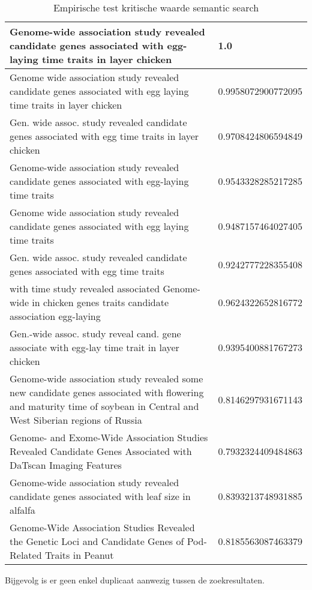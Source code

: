 \begin{table}[h!]
    \caption{Empirische test kritische waarde semantic search}
    \centering
    \begin{tabularx}{\textwidth}{|X|p{4cm}|} 
        \hline
        Genome-wide association study revealed candidate genes associated with egg-laying time traits in layer chicken&1.0\\
        \hline
        Genome wide association study revealed candidate genes associated with egg laying time traits in layer chicken&0.9958072900772095\\
        \hline
        Gen. wide assoc. study revealed candidate genes associated with egg time traits in layer chicken&0.9708424806594849\\
        \hline
        Genome-wide association study revealed candidate genes associated with egg-laying time traits&0.9543328285217285\\
        \hline
        Genome wide association study revealed candidate genes associated with egg laying time traits&0.9487157464027405\\
        \hline
        Gen. wide assoc. study revealed candidate genes associated with egg time traits&0.9242777228355408\\
        \hline
        with time study revealed associated Genome-wide in chicken genes traits candidate association egg-laying&0.9624322652816772\\
        \hline
        Gen.-wide assoc. study reveal cand. gene associate with egg-lay time trait in layer chicken&0.9395400881767273\\
        \hline
        Genome-wide association study revealed some new candidate genes associated with flowering and maturity time of soybean in Central and West Siberian regions of Russia&0.8146297931671143\\
        \hline
        Genome- and Exome-Wide Association Studies Revealed Candidate Genes Associated with DaTscan Imaging Features&0.7932324409484863\\
        \hline
        Genome-wide association study revealed candidate genes associated with leaf size in alfalfa&0.8393213748931885\\
        \hline
        Genome-Wide Association Studies Revealed the Genetic Loci and Candidate Genes of Pod-Related Traits in Peanut&0.8185563087463379\\
        \hline
    \end{tabularx}
    \label{table:empirisch}
\end{table}
Bijgevolg is er geen enkel duplicaat aanwezig tussen de zoekresultaten.
